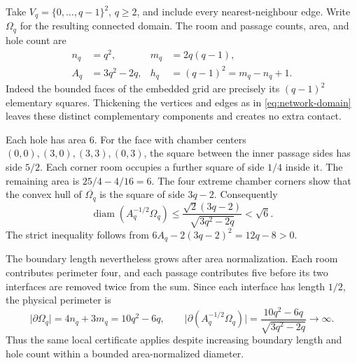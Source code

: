 \documentclass[11pt,reqno]{amsart}
\numberwithin{equation}{section}
\newcommand{\abs}[1]{\lvert#1\rvert}
\newcommand{\Om}{\Omega}
\DeclareMathOperator{\diam}{diam}
\begin{document}
Take $V_q=\{0,\ldots,q-1\}^2$, $q\ge2$, and include every
nearest-neighbour edge. Write $\Om_q$ for the resulting connected
domain. The room and passage counts, area, and hole count are
\begin{align}
 n_q&=q^2,&m_q&=2q(q-1),\\
 A_q&=3q^2-2q,&h_q&=(q-1)^2=m_q-n_q+1.
 \label{eq:grid-data}
\end{align}
Indeed the bounded faces of the embedded grid are precisely its
$(q-1)^2$ elementary squares. Thickening the vertices and edges
as in \eqref{eq:network-domain} leaves these distinct complementary
components and creates no extra contact.

Each hole has area $6$. For the face with chamber centers
$(0,0),(3,0),(3,3),(0,3)$, the square between the inner passage
sides has side $5/2$. Each corner room occupies a further square
of side $1/4$ inside it. The remaining area is
$25/4-4/16=6$. The four extreme chamber corners show that the
convex hull of $\overline{\Om_q}$ is the square of side $3q-2$.
Consequently
\begin{equation}\label{eq:grid-diameter}
 \diam(A_q^{-1/2}\Om_q)
 \le\frac{\sqrt2(3q-2)}{\sqrt{3q^2-2q}}<\sqrt6.
\end{equation}
The strict inequality follows from
$6A_q-2(3q-2)^2=12q-8>0$.

The boundary length nevertheless grows after area normalization. Each
room contributes perimeter four, and each passage contributes five
before its two interfaces are removed twice from the sum. Since each
interface has length $1/2$, the physical perimeter is
\[
 \abs{\partial\Om_q}=4n_q+3m_q=10q^2-6q,
 \qquad
 \abs{\partial(A_q^{-1/2}\Om_q)}
 =\frac{10q^2-6q}{\sqrt{3q^2-2q}}\longrightarrow\infty.
\]
Thus the same local certificate applies despite increasing boundary
length and hole count within a bounded area-normalized diameter.
\end{document}
